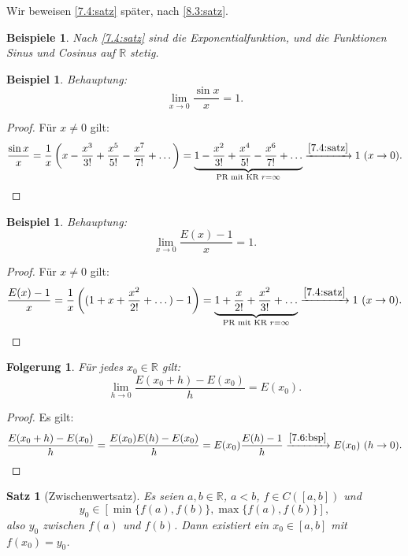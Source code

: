 \documentclass[12pt]{extreport} %
\newcommand{\R}{\mathbb{R}}
\theoremstyle{named}
\theoremstyle{itshape}
\newtheorem{satz}[unnamedtheorem]{Satz}
\theoremstyle{normal}
\newtheorem{beispiel}[unnamedtheorem]{Beispiel}
\newtheorem*{beispiele}{Beispiele}
\newtheorem*{folgerung*}{Folgerung}
\begin{document}
Wir beweisen \ref{7.4:satz} später, nach \ref{8.3:satz}.


\begin{beispiele}
	Nach \ref{7.4:satz} sind die Exponentialfunktion, und die Funktionen Sinus und Cosinus auf $\R$ stetig.	
\end{beispiele}


\begin{beispiel} \label{7.5:bsp}
	Behauptung: $$\lim_{x \rightarrow 0} \frac{\sin x}{x} = 1.$$
\end{beispiel}

\begin{proof}
	Für $x \neq 0$ gilt: 
	$$ \frac{\sin x}{x} = \frac{1}{x} \left( x - \frac{x^{3}}{3!} + \frac{x^{5}}{5!} - \frac{x^{7}}{7!} + \dotsc \right) 
	= \underbrace{1 - \frac{x^{2}}{3!} + \frac{x^{4}}{5!} - \frac{x^{6}}{7!} + \dotsc}_{\text{PR mit KR } r = \infty} \xrightarrow[]{\ref{7.4:satz}} 1 ~(x \rightarrow 0). $$
\end{proof}


\begin{beispiel} \label{7.6:bsp}
	Behauptung: $$\lim_{x \rightarrow 0} \frac{E(x) - 1}{x} = 1.$$
\end{beispiel}

\begin{proof}
	Für $x \neq 0$ gilt:
	$$ \frac{E(x) - 1}{x} = \frac{1}{x} \left( ( 1+ x + \frac{x^{2}}{2!} + \dotsc) - 1 \right) = \underbrace{1 + \frac{x}{2!} + \frac{x^{2}}{3!} + \dotsc}_{\text{PR mit KR } r = \infty} \xrightarrow[]{\ref{7.4:satz}} 1 ~(x \rightarrow 0). $$
\end{proof}


\begin{folgerung*}
	Für jedes $x_{0} \in \R$ gilt:
	$$\lim_{h \rightarrow 0} \frac{E(x_{0} + h) - E(x_{0})}{h} = E(x_{0}).$$
\end{folgerung*}

\begin{proof}
        Es gilt: 
	$$\frac{E(x_{0} + h) - E(x_{0})}{h} =  \frac{E(x_{0}) E(h) - E(x_{0})}{h} =  E(x_{0}) \frac{E(h) - 1}{h} \xrightarrow[]{\ref{7.6:bsp}} E(x_{0}) ~(h \rightarrow 0).$$
\end{proof}

\begin{satz}[Zwischenwertsatz]  \label{7.7:prop-Zwischenwertsatz} 
	Es seien $a, b \in \R$, $a < b$, $f \in C\left([a,b]\right)$ und 
	$$
	y_0  \in [\min\{f(a),f(b)\}, \max\{f(a),f(b)\}],
	$$
	also $y_{0}$ zwischen $f(a)$ und $f(b)$. Dann existiert ein $x_{0} \in [a, b]$ mit $f(x_{0}) = y_{0}$.
\end{satz}
\end{document}
